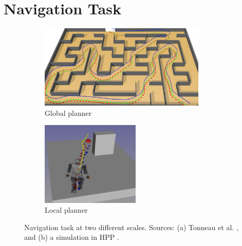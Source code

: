 


\section{Navigation Task \label{sota3}}

\begin{figure}[h]
    \centering
    \captionsetup[subfigure]{justification=centering}
    \begin{subfigure}[t]{0.40\linewidth}
    \includegraphics[width=\textwidth,height=4cm]{Figures/Chapter_SOTA//sl1m_maze.png}
    \caption{Global planner}
    \label{fig:nav_ex_0}
    \end{subfigure}
    \begin{subfigure}[t]{0.40\linewidth}
    \includegraphics[width=\textwidth,height=4cm,trim={2cm 2cm 2cm 0},clip]{Figures/Chapter_SOTA//local_planning_wall.png}
    \caption{Local planner}
    \label{fig:nav_ex_1}
    \end{subfigure}
    \caption{Navigation task at two different scales. Sources: (a) Tonneau et al. \cite{sl1m_v1}, and (b) a simulation in HPP \cite{HPP}.}
\end{figure}


